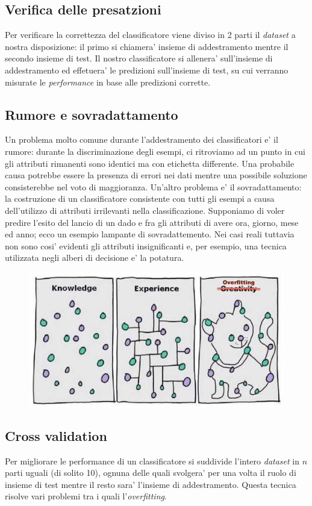 \subsection*{Verifica delle presatzioni}
Per verificare la correttezza del classificatore viene diviso in 2 parti il \textit{dataset} a nostra disposizione: il primo si chiamera' insieme di addestramento mentre il secondo insieme di test. Il nostro classificatore si allenera' sull'insieme di addestramento ed effetuera' le predizioni sull'insieme di test, su cui verranno misurate le \textit{performance} in base alle predizioni corrette.

\subsection*{Rumore e sovradattamento}
Un problema molto comune durante l'addestramento dei classificatori e' il rumore: durante la discriminazione degli esempi, ci ritroviamo ad un punto in cui gli attributi rimanenti sono identici ma con etichetta differente. Una probabile causa potrebbe essere la presenza di errori nei dati mentre una possibile soluzione consisterebbe nel voto di maggioranza.
Un'altro problema e' il sovradattamento: la costruzione di un classificatore consistente con tutti gli esempi a causa dell'utilizzo di attributi irrilevanti nella classificazione. Supponiamo di voler predire l'esito del lancio di un dado e fra gli attributi di avere ora, giorno, mese ed anno; ecco un esempio lampante di sovradattemento. Nei casi reali tuttavia non sono cosi' evidenti gli attributi insignificanti e, per esempio, una tecnica utilizzata  negli alberi di decisione e' la potatura.

\begin{figure}[H]
	\centering
	\includegraphics[width=0.7\linewidth]{img/overfitting}
	\caption{}
	\label{fig:overfitting}
\end{figure}


\subsection*{Cross validation}
Per migliorare le performance di un classificatore si suddivide l'intero \textit{dataset} in $n$ parti uguali (di solito 10), ognuna delle quali svolgera' per una volta il ruolo di insieme di test mentre il resto sara' l'insieme di addestramento. Questa tecnica risolve vari problemi tra i quali l'\textit{overfitting}.\\

